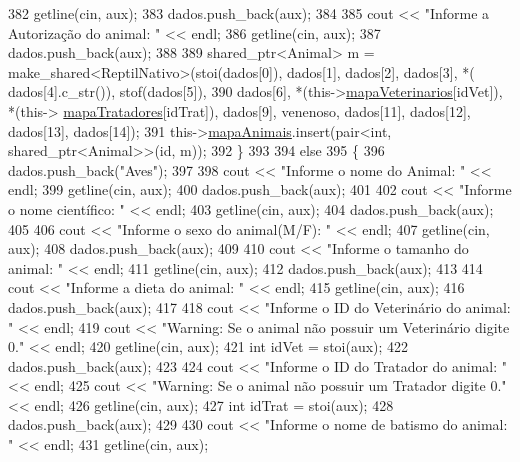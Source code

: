 \begin{DoxyCode}
382         getline(cin, aux);
383         dados.push\_back(aux);
384 
385         cout << \textcolor{stringliteral}{"Informe a Autorização do animal: "} << endl;
386         getline(cin, aux);
387         dados.push\_back(aux);
388 
389         shared\_ptr<Animal> m = make\_shared<ReptilNativo>(stoi(dados[0]), dados[1], dados[2], dados[3], *(
      dados[4].c\_str()), stof(dados[5]),
390                     dados[6], *(this->\hyperlink{classPetFera_a2bed2112a627bbdb3c0338654330a1ab}{mapaVeterinarios}[idVet]), *(this->
      \hyperlink{classPetFera_ac85920fc6c1471743838e6fe4444304d}{mapaTratadores}[idTrat]), dados[9], venenoso, dados[11], dados[12], dados[13], dados[14]);
391         this->\hyperlink{classPetFera_ab0ba5fe6332bcffdabb7b03001280697}{mapaAnimais}.insert(pair<\textcolor{keywordtype}{int}, shared\_ptr<Animal>>(\textcolor{keywordtype}{id}, m));
392     \}
393 
394     \textcolor{keywordflow}{else}
395     \{
396         dados.push\_back(\textcolor{stringliteral}{"Aves"});
397 
398         cout << \textcolor{stringliteral}{"Informe o nome do Animal: "} << endl;
399         getline(cin, aux);
400         dados.push\_back(aux);
401 
402         cout << \textcolor{stringliteral}{"Informe o nome científico:  "} << endl;
403         getline(cin, aux);
404         dados.push\_back(aux);
405 
406         cout << \textcolor{stringliteral}{"Informe o sexo do animal(M/F): "} << endl;
407         getline(cin, aux);
408         dados.push\_back(aux);
409 
410         cout << \textcolor{stringliteral}{"Informe o tamanho do animal: "} << endl;
411         getline(cin, aux);
412         dados.push\_back(aux);
413 
414         cout << \textcolor{stringliteral}{"Informe a dieta do animal: "} << endl;
415         getline(cin, aux);
416         dados.push\_back(aux);
417 
418         cout << \textcolor{stringliteral}{"Informe o ID do Veterinário do animal: "} << endl;
419         cout << \textcolor{stringliteral}{"Warning: Se o animal não possuir um Veterinário digite 0."} << endl;
420         getline(cin, aux);
421         \textcolor{keywordtype}{int} idVet = stoi(aux);
422         dados.push\_back(aux);
423 
424         cout << \textcolor{stringliteral}{"Informe o ID do Tratador do animal: "} << endl;
425         cout << \textcolor{stringliteral}{"Warning: Se o animal não possuir um Tratador digite 0."} << endl;
426         getline(cin, aux);
427         \textcolor{keywordtype}{int} idTrat = stoi(aux);
428         dados.push\_back(aux);
429 
430         cout << \textcolor{stringliteral}{"Informe o nome de batismo do animal: "} << endl;
431         getline(cin, aux);

\end{DoxyCode}
